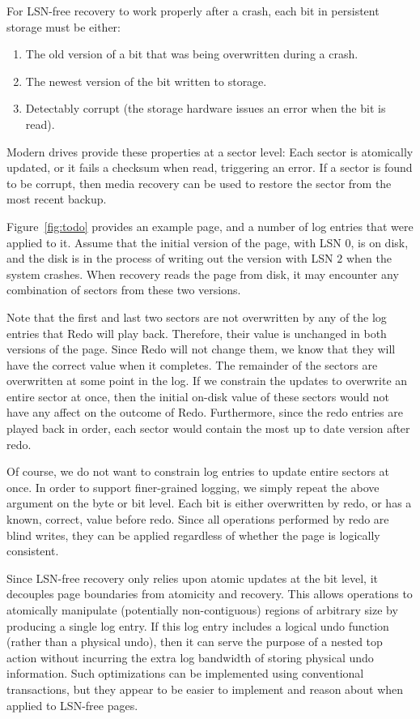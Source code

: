 \documentclass[letterpaper,twocolumn,10pt]{article}
\begin{document}
For LSN-free recovery to work properly after a crash, each bit in
persistent storage must be either:

\begin{enumerate}
\item The old version of a bit that was being overwritten during a crash.
\item The newest version of the bit written to storage.
\item Detectably corrupt (the storage hardware issues an error when the
  bit is read).
\end{enumerate}

Modern drives provide these properties at a sector level: Each sector
is atomically updated, or it fails a checksum when read, triggering an
error.  If a sector is found to be corrupt, then media recovery can be
used to restore the sector from the most recent backup.

Figure~\ref{fig:todo} provides an example page, and a number of log
entries that were applied to it.  Assume that the initial version of
the page, with LSN $0$, is on disk, and the disk is in the process of
writing out the version with LSN $2$ when the system crashes.  When
recovery reads the page from disk, it may encounter any combination of
sectors from these two versions.

Note that the first and last two sectors are not overwritten by any
of the log entries that Redo will play back.  Therefore, their value
is unchanged in both versions of the page.  Since Redo will not change
them, we know that they will have the correct value when it completes.
The remainder of the sectors are overwritten at some point in the log.
If we constrain the updates to overwrite an entire sector at once, then
the initial on-disk value of these sectors would not have any affect
on the outcome of Redo.  Furthermore, since the redo entries are
played back in order, each sector would contain the most up to date
version after redo.

Of course, we do not want to constrain log entries to update entire
sectors at once.  In order to support finer-grained logging, we simply
repeat the above argument on the byte or bit level.  Each bit is
either overwritten by redo, or has a known, correct, value before
redo.  Since all operations performed by redo are blind writes, they
can be applied regardless of whether the page is logically consistent.

Since LSN-free recovery only relies upon atomic updates at the bit
level, it decouples page boundaries from atomicity and recovery.  
This allows operations to atomically manipulate
(potentially non-contiguous) regions of arbitrary size by producing a
single log entry.  If this log entry includes a logical undo function
(rather than a physical undo), then it can serve the purpose of a
nested top action without incurring the extra log bandwidth of storing
physical undo information.  Such optimizations can be implemented
using conventional transactions, but they appear to be easier to
implement and reason about when applied to LSN-free pages.
\end{document}
